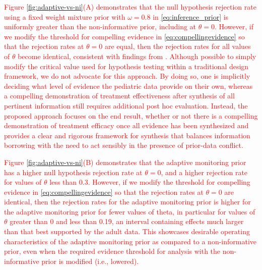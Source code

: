 \documentclass[12pt]{article}
\begin{document}
\textcolor{red}{Figure \ref{fig:adaptive-vs-ni}(A) demonstrates that the null hypothesis rejection rate using a fixed weight mixture prior with $\omega=0.8$ in \eqref{eq:inference_prior} is uniformly greater than the non-informative prior, including at $\theta=0$. However, if we modify the threshold for compelling evidence in \eqref{eq:compellingevidence} so that the rejection rates at $\theta=0$ are equal, then the rejection rates for all values of $\theta$ become identical, consistent with findings from \cite{Psioda2018}. Although possible to simply modify the critical value used for hypothesis testing within a traditional design framework, we do not advocate for this approach. By doing so, one is implicitly deciding what level of evidence the pediatric data provide on their own, whereas a compelling demonstration of treatment effectiveness after synthesis of all pertinent information still requires additional post hoc evaluation. Instead, the proposed approach focuses on the end result, whether or not there is a compelling demonstration of treatment efficacy once all evidence has been synthesized and provides a clear and rigorous framework for synthesis that balances information borrowing with the need to act sensibly in the presence of prior-data conflict.}

\textcolor{red}{Figure \ref{fig:adaptive-vs-ni}(B) demonstrates that the adaptive monitoring prior has a higher null hypothesis rejection rate at $\theta=0$, and a higher rejection rate for values of $\theta$ less than 0.3. However, if we modify the threshold for compelling evidence in \eqref{eq:compellingevidence} so that the rejection rates at $\theta=0$ are identical, then the rejection rates for the adaptive monitoring prior is higher for the adaptive monitoring prior for fewer values of theta, in particular for values of $\theta$ greater than 0 and less than 0.19, an interval containing effects much larger than that best supported by the adult data. This showcases desirable operating characteristics of the adaptive monitoring prior as compared to a non-informative prior, even when the required evidence threshold for analysis with the non-informative prior is modified (i.e., lowered).}

\end{document}
